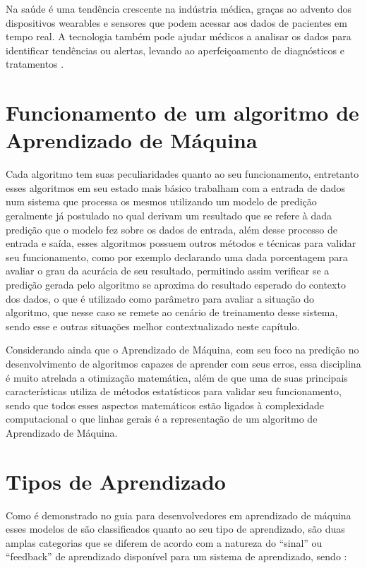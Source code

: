 Na saúde é uma tendência crescente na indústria médica, graças ao advento dos dispositivos wearables e sensores que podem acessar aos dados de pacientes em tempo real. A tecnologia também pode ajudar médicos a analisar os dados para identificar tendências ou alertas, levando ao aperfeiçoamento de diagnósticos e tratamentos \cite{Sas}.

\section{Funcionamento de um algoritmo de Aprendizado de Máquina}
Cada algoritmo tem suas peculiaridades quanto ao seu funcionamento, entretanto esses algoritmos em seu estado mais básico trabalham com a entrada de dados num sistema que processa os mesmos utilizando um modelo de predição geralmente já postulado no qual derivam um resultado que se refere à dada predição que o modelo fez sobre os dados de entrada, além desse processo de entrada e saída, esses algoritmos possuem outros métodos e técnicas para validar seu funcionamento, como por exemplo declarando uma dada porcentagem para avaliar o grau da acurácia de seu resultado, permitindo assim verificar se a predição gerada pelo algoritmo se aproxima do resultado esperado do contexto dos dados, o que é utilizado como parâmetro para avaliar a situação do algoritmo, que nesse caso se remete ao cenário de treinamento desse sistema, sendo esse e outras situações melhor contextualizado neste capítulo.

Considerando ainda que o Aprendizado de Máquina, com seu foco na predição no desenvolvimento de algoritmos capazes de aprender com seus erros, essa disciplina é muito atrelada a otimização matemática, além de que uma de suas principais características utiliza de métodos estatísticos para validar seu funcionamento, sendo que todos esses aspectos matemáticos estão ligados à complexidade computacional o que linhas gerais é a representação de um algoritmo de Aprendizado de Máquina.

\section{Tipos de Aprendizado}
Como é demonstrado no guia para desenvolvedores em aprendizado de máquina esses modelos de são classificados quanto ao seu tipo de aprendizado, são duas amplas categorias que se diferem de acordo com a natureza do “sinal” ou “feedback” de aprendizado disponível para um sistema de aprendizado, sendo \cite{Aurélien}:
    
